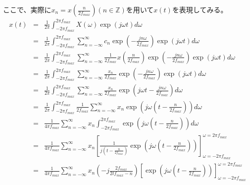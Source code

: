 \documentclass[a4paper]{jsarticle}
\begin{document}
ここで、実際に$ x_n = x \left( \frac { n } { 2 f_{max} } \right) \left( n \in \mathbb{Z} \right) $を用いて$ x \left( t \right) $を表現してみる。
\begin{eqnarray}
	x \left( t \right) & = & \frac { 1 } { 2 \pi } \int _{ -2 \pi f_{max} } ^{ 2 \pi f_{max} } X \left( \omega \right) \exp \left( j \omega t \right) d \omega \nonumber \\
	& = & \frac { 1 } { 2 \pi } \int _{ -2 \pi f_{max} } ^{ 2 \pi f_{max} } \sum _{ n = - \infty } ^\infty c_n \exp \left( - \frac { jn \omega } { 2 f_{max} } \right) \exp \left( j \omega t \right) d \omega \nonumber \\
	& = & \frac { 1 } { 2 \pi } \int _{ -2 \pi f_{max} } ^{ 2 \pi f_{max} } \sum _{ n = - \infty } ^\infty \frac { 1 } { 2 f_{max} } x \left( \frac { n } { 2 f_{max} } \right) \exp \left( - \frac { jn \omega } { 2 f_{max} } \right) \exp \left( j \omega t \right) d \omega \nonumber \\
	& = & \frac { 1 } { 2 \pi } \int _{ -2 \pi f_{max} } ^{ 2 \pi f_{max} } \sum _{ n = - \infty } ^\infty \frac { x_n } { 2 f_{max} } \exp \left( - \frac { jn \omega } { 2 f_{max} } \right) \exp \left( j \omega t \right) d \omega \nonumber \\
	& = & \frac { 1 } { 2 \pi } \int _{ -2 \pi f_{max} } ^{ 2 \pi f_{max} } \sum _{ n = - \infty } ^\infty \frac { x_n } { 2 f_{max} } \exp \left( j \omega t - \frac { jn \omega } { 2 f_{max} } \right) d \omega \nonumber \\
	& = & \frac { 1 } { 2 \pi } \int _{ -2 \pi f_{max} } ^{ 2 \pi f_{max} } \frac { 1 } { 2 f_{max} } \sum _{ n = - \infty } ^\infty x_n \exp \left( j \omega \left( t - \frac { n } { 2 f_{max} } \right) \right) d \omega \nonumber \\
	& = & \frac { 1 } { 4 \pi f_{max} } \sum _{ n = - \infty } ^\infty x_n \int _{ -2 \pi f_{max} } ^{ 2 \pi f_{max} } \exp \left( j \omega \left( t - \frac { n } { 2 f_{max} } \right) \right) d \omega \nonumber \\
	& = & \frac { 1 } { 4 \pi f_{max} } \sum _{ n = - \infty } ^\infty x_n \left[ \frac { 1 } { j \left( t - \frac { n } { 2 f_{max} } \right) } \exp \left( j \omega \left( t - \frac { n } { 2 f_{max} } \right) \right) \right] _{ \omega = -2 \pi f_{max} } ^{ \omega = 2 \pi f_{max} } \nonumber \\
	& = & \frac { 1 } { 4 \pi f_{max} } \sum _{ n = - \infty } ^\infty x_n \left( -j \frac { 2 f_{max} } { 2tf_{max} - n } \right) \left[ \exp \left( j \omega \left( t - \frac { n } { 2 f_{max} } \right) \right) \right] _{ \omega = -2 \pi f_{max} } ^{ \omega = 2 \pi f_{max} } \nonumber \\

\end{eqnarray}
\end{document}
